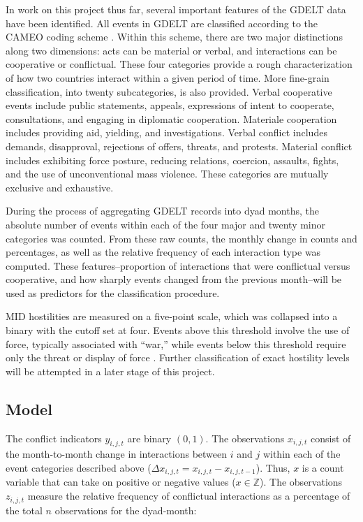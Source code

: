 \documentclass[12pt,letterpaper]{article}
\begin{document}
In work on this project thus far, several important features of the GDELT data have been identified. All events in GDELT are classified according to the CAMEO coding scheme \citep{gerner:etal:2002}. Within this scheme, there are two major distinctions along two dimensions: acts can be material or verbal, and interactions can be cooperative or conflictual. These four categories provide a rough characterization of how two countries interact within a given period of time. More fine-grain classification, into twenty subcategories, is also provided. Verbal cooperative events include public statements, appeals, expressions of intent to cooperate, consultations, and engaging in diplomatic cooperation. Materiale cooperation includes providing aid, yielding, and investigations. Verbal conflict includes demands, disapproval, rejections of offers, threats, and protests. Material conflict includes exhibiting force posture, reducing relations, coercion, assaults, fights, and the use of unconventional mass violence. These categories are mutually exclusive and exhaustive. 

During the process of aggregating GDELT records into dyad months, the absolute number of events within each of the four major and twenty minor categories was counted. From these raw counts, the monthly change in counts and percentages, as well as the relative frequency of each interaction type was computed. These features--proportion of interactions that were conflictual versus cooperative, and how sharply events changed from the previous month--will be used as predictors for the classification procedure. 

MID hostilities are measured on a five-point scale, which was collapsed into a binary with the cutoff set at four. Events above this threshold involve the use of force, typically associated with ``war,'' while events below this threshold require only the threat or display of force \citep{ghosn2004mid3}. Further classification of exact hostility levels will be attempted in a later stage of this project. 

\subsection{Model}

The conflict indicators $y_{i,j,t}$ are binary $(0,1)$. The observations $x_{i,j,t}$ consist of the month-to-month change in interactions between $i$ and $j$ within each of the event categories described above ($\Delta x_{i,j,t} = x_{i,j,t} - x_{i,j,t-1}$). Thus, $x$ is a count variable that can take on positive or negative values ($x \in \mathbb{Z}$). The observations $z_{i,j,t}$ measure the relative frequency of conflictual interactions as a percentage of the total $n$ observations for the dyad-month: 
\end{document}
